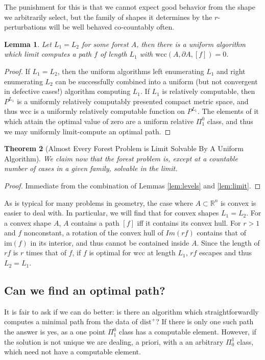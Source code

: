 \documentclass[10pt,a4paper]{article}
\newtheorem{thm}{Theorem}[section]    %
\newtheorem{lem}[thm]{Lemma}          %
\theoremstyle{definition}
\def\R{\mathbb{R}}
\begin{document}
The punishment for this is that we cannot expect good behavior from the shape we arbitrarily select, but the family of shapes it determines by the $r$-perturbations will be well behaved co-countably often.

\begin{lem}
Let $L_1 = L_2$ for some forest $A$, then there is a uniform algorithm which limit computes a path $f$ of length $L_1$ with $\mathrm{wcc}(A,\partial A, [f]) = 0$.
\end{lem}
\label{lem:limit}
\begin{proof}
If $L_1 = L_2$, then the uniform algorithms left enumerating $L_1$ and right enumerating $L_2$ can be successfully combined into a uniform (but not convergent in defective cases!) algorithm computing $L_1$. If $L_1$ is relatively computable, then $P^{L_1}$ is a uniformly relatively computably presented compact metric space, and thus $\mathrm{wcc}$ is a uniformly relatively computable function on $P^{L_1}$. The elements of it which attain the optimal value of zero are a uniform relative $\Pi^0_1$ class, and thus we may uniformly limit-compute an optimal path.
\end{proof}

\begin{thm}[Almost Every Forest Problem is Limit Solvable By A Uniform Algorithm]
We claim now that the forest problem is, except at a countable number of cases in a given family, solvable in the limit.
\end{thm}
\label{thm:almost}

\begin{proof}
    Immediate from the combination of Lemmas \ref{lem:levels} and \ref{lem:limit}.
\end{proof}

As is typical for many problems in geometry, the case where $A\subset \R^n$ is convex is easier to deal with. In particular, we will find that for convex shapes $L_1 = L_2$. For a convex shape $A$, $A$ contains a path $[f]$ iff it contains its convex hull. For $r > 1$ and $f$ nonconstant, a rotation of the convex hull of $ Im(r f)$ contains that of $\mathrm{im}(f)$ in its interior, and thus cannot be contained inside $A$. Since the length of $rf$ is $r$ times that of $f$, if $f$ is optimal for $\mathrm{wcc}$ at length $L_1$, $rf$ escapes and thus $L_2 = L_1$.

\subsection{Can we find an optimal path?}
\label{sec:canwe?}
It is fair to ask if we can do better: is there an algorithm which straightforwardly computes a minimal path from the data of $\mathrm{dist}^+$? If there is only one such path the answer is yes, as a one point $\Pi^0_1$ class has a computable element. However, if the solution is not unique we are dealing, a priori, with a an arbitrary $\Pi_0^1$ class, which need not have a computable element. 
\end{document}
